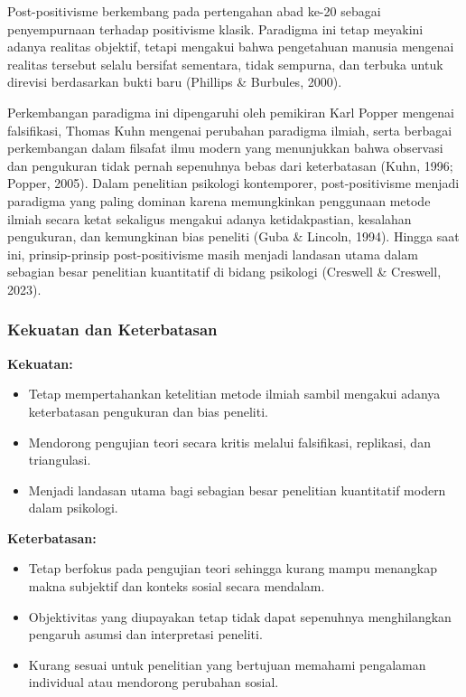 \documentclass[
  indonesian,
  letterpaper,
  DIV=11,
  numbers=noendperiod]{scrreprt}
\providecommand{\tightlist}{%
  \setlength{\itemsep}{0pt}\setlength{\parskip}{0pt}}
\begin{document}
Post-positivisme berkembang pada pertengahan abad ke-20 sebagai
penyempurnaan terhadap positivisme klasik. Paradigma ini tetap meyakini
adanya realitas objektif, tetapi mengakui bahwa pengetahuan manusia
mengenai realitas tersebut selalu bersifat sementara, tidak sempurna,
dan terbuka untuk direvisi berdasarkan bukti baru (Phillips \& Burbules,
2000).

Perkembangan paradigma ini dipengaruhi oleh pemikiran Karl Popper
mengenai falsifikasi, Thomas Kuhn mengenai perubahan paradigma ilmiah,
serta berbagai perkembangan dalam filsafat ilmu modern yang menunjukkan
bahwa observasi dan pengukuran tidak pernah sepenuhnya bebas dari
keterbatasan (Kuhn, 1996; Popper, 2005). Dalam penelitian psikologi
kontemporer, post-positivisme menjadi paradigma yang paling dominan
karena memungkinkan penggunaan metode ilmiah secara ketat sekaligus
mengakui adanya ketidakpastian, kesalahan pengukuran, dan kemungkinan
bias peneliti (Guba \& Lincoln, 1994). Hingga saat ini, prinsip-prinsip
post-positivisme masih menjadi landasan utama dalam sebagian besar
penelitian kuantitatif di bidang psikologi (Creswell \& Creswell, 2023).

\subsubsection{Kekuatan dan
Keterbatasan}\label{kekuatan-dan-keterbatasan-1}

\textbf{Kekuatan:}

\begin{itemize}
\tightlist
\item
  Tetap mempertahankan ketelitian metode ilmiah sambil mengakui adanya
  keterbatasan pengukuran dan bias peneliti.
\item
  Mendorong pengujian teori secara kritis melalui falsifikasi,
  replikasi, dan triangulasi.
\item
  Menjadi landasan utama bagi sebagian besar penelitian kuantitatif
  modern dalam psikologi.
\end{itemize}

\textbf{Keterbatasan:}

\begin{itemize}
\tightlist
\item
  Tetap berfokus pada pengujian teori sehingga kurang mampu menangkap
  makna subjektif dan konteks sosial secara mendalam.
\item
  Objektivitas yang diupayakan tetap tidak dapat sepenuhnya
  menghilangkan pengaruh asumsi dan interpretasi peneliti.
\item
  Kurang sesuai untuk penelitian yang bertujuan memahami pengalaman
  individual atau mendorong perubahan sosial.
\end{itemize}
\end{document}
